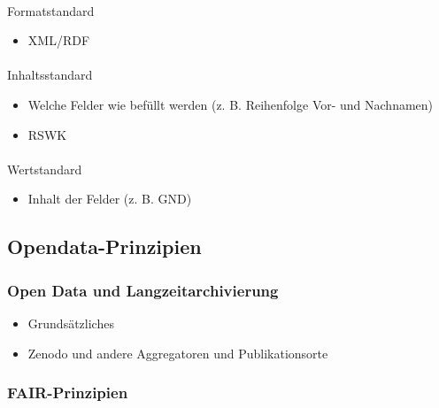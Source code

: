 \documentclass[
  letterpaper,
  DIV=11,
  numbers=noendperiod]{scrartcl}
\makeatletter
\let\oldparagraph\paragraph
\renewcommand{\paragraph}{
    \@ifstar
      \xxxParagraphStar
      \xxxParagraphNoStar
  }
\newcommand{\xxxParagraphStar}[1]{\oldparagraph*{#1}\mbox{}}
\newcommand{\xxxParagraphNoStar}[1]{\oldparagraph{#1}\mbox{}}
\providecommand{\tightlist}{%
  \setlength{\itemsep}{0pt}\setlength{\parskip}{0pt}}\usepackage{longtable,booktabs,array}
\makeatother
\begin{document}
\paragraph{Formatstandard}\label{formatstandard}

\begin{itemize}
\tightlist
\item
  XML/RDF
\end{itemize}

\paragraph{Inhaltsstandard}\label{inhaltsstandard}

\begin{itemize}
\tightlist
\item
  Welche Felder wie befüllt werden (z. B. Reihenfolge Vor- und
  Nachnamen)
\item
  RSWK
\end{itemize}

\paragraph{Wertstandard}\label{wertstandard}

\begin{itemize}
\tightlist
\item
  Inhalt der Felder (z. B. GND)
\end{itemize}

\subsection{Opendata-Prinzipien}\label{opendata-prinzipien}

\subsubsection{Open Data und
Langzeitarchivierung}\label{open-data-und-langzeitarchivierung}

\begin{itemize}
\tightlist
\item
  Grundsätzliches
\item
  Zenodo und andere Aggregatoren und Publikationsorte
\end{itemize}

\subsubsection{FAIR-Prinzipien}\label{fair-prinzipien}
\end{document}
